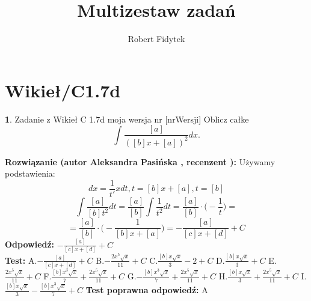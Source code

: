 \documentclass[12pt, a4paper]{article}
\title{Multizestaw zadań}
\author{Robert Fidytek}
\date{}
\theoremstyle{definition} %
\newtheorem{zad}{}
\newcommand{\kategoria}[1]{\section{#1}} %
\newcommand{\zadStart}[1]{\begin{zad}#1\newline} %
\newcommand{\zadStop}{\end{zad}}   %
\newcommand{\rozwStart}[2]{\noindent \textbf{Rozwiązanie (autor #1 , recenzent #2): }\newline} %
\newcommand{\rozwStop}{\newline}                                            %
\newcommand{\odpStart}{\noindent \textbf{Odpowiedź:}\newline}    %
\newcommand{\odpStop}{\newline}                                             %
\newcommand{\testStart}{\noindent \textbf{Test:}\newline} %
\newcommand{\testStop}{\newline} %
\newcommand{\kluczStart}{\noindent \textbf{Test poprawna odpowiedź:}\newline} %
\newcommand{\kluczStop}{\newline} %
\begin{document}
\maketitle


\kategoria{Wikieł/C1.7d}
\zadStart{Zadanie z Wikieł C 1.7d moja wersja nr [nrWersji]}
Oblicz całke $$\int \frac{[a]}{([b]x+[a])^{2}}dx.$$
\zadStop
\rozwStart{Aleksandra Pasińska}{}
Używamy podstawienia:
$$dx=\frac{1}{t'}xdt,t=[b]x+[a], t=[b]$$
$$\int \frac{[a]}{[b]t^2}dt=\frac{[a]}{[b]}\int \frac{1}{t^2}dt=\frac{[a]}{[b]}\cdot \bigg(-\frac{1}{t}\bigg)=$$
$$=\frac{[a]}{[b]}\cdot \bigg(-\frac{1}{[b]x+[a]}\bigg)=-\frac{[a]}{[c]x+[d]}+C$$
\rozwStop
\odpStart
$-\frac{[a]}{[c]x+[d]}+C$\\
\odpStop
\testStart
A.$-\frac{[a]}{[c]x+[d]}+C$
B.$-\frac{2x^5\sqrt{x}}{11}+C$
C.$\frac{[b]x\sqrt{x}}{3}-2+C$
D.$\frac{[b]x\sqrt{x}}{3}+C$
E.$\frac{2x^5\sqrt{x}}{11}+C$
F.$\frac{[b]x^3\sqrt{x}}{7}+\frac{2x^5\sqrt{x}}{11}+C$
G.$-\frac{[b]x^3\sqrt{x}}{7}+\frac{2x^5\sqrt{x}}{11}+C$
H.$\frac{[b]x\sqrt{x}}{3}+\frac{2x^5\sqrt{x}}{11}+C$
I.$\frac{[b]x\sqrt{x}}{3}-\frac{[b]x^3\sqrt{x}}{7}+C$
\testStop
\kluczStart
A
\kluczStop
\end{document}
